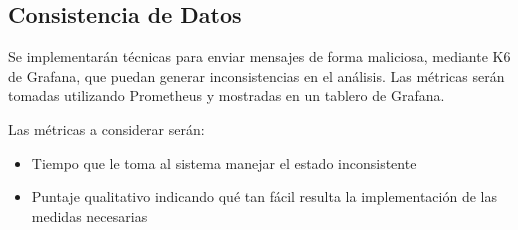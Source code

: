 \subsection{Consistencia de Datos}

Se implementarán técnicas para enviar mensajes de forma maliciosa, mediante K6 de Grafana, que puedan generar inconsistencias en el análisis.
Las métricas serán tomadas utilizando Prometheus y mostradas en un tablero de Grafana.

Las métricas a considerar serán:
\begin{itemize}
    \item Tiempo que le toma al sistema manejar el estado inconsistente
    \item Puntaje qualitativo indicando qué tan fácil resulta la implementación de las medidas necesarias
\end{itemize}